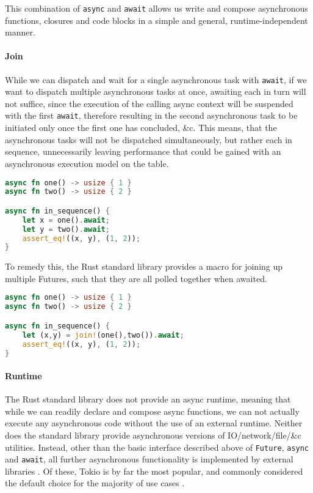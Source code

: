\documentclass[a4paper,UKenglish,cleveref, autoref, thm-restate]{lipics-v2021}
\begin{document}
This combination of \lstinline{async} and \lstinline{await} allows us write and compose asynchronous functions, closures and code blocks in a simple and general, runtime-independent manner.

\paragraph*{Join}

While we can dispatch and wait for a single asynchronous task with \lstinline{await}, if we want to dispatch multiple asynchronous tasks at once, awaiting each in turn will not suffice, since the execution of the calling async context will be suspended with the first \lstinline{await}, therefore resulting in the second asynchronous task to be initiated only once the first one has concluded, \&c. This means, that the asynchronous tasks will not be dispatched simultaneously, but rather each in sequence, unnecessarily leaving performance that could be gained with an asynchronous execution model on the table.

\begin{minipage}{\linewidth}
\begin{lstlisting}[language=Rust,caption={Sequential await},captionpos=t]
async fn one() -> usize { 1 }
async fn two() -> usize { 2 }

async fn in_sequence() {
    let x = one().await;
    let y = two().await;
    assert_eq!((x, y), (1, 2));
}
\end{lstlisting}
\end{minipage}

To remedy this, the Rust standard library provides a macro for joining up multiple Futures, such that they are all polled together when awaited.

\begin{minipage}{\linewidth}
\begin{lstlisting}[language=Rust,caption={Joined await},captionpos=t]
async fn one() -> usize { 1 }
async fn two() -> usize { 2 }

async fn in_sequence() {
    let (x,y) = join!(one(),two()).await;
    assert_eq!((x, y), (1, 2));
}
\end{lstlisting}
\end{minipage}

\paragraph*{Runtime}

The Rust standard library does not provide an async runtime, meaning that while we can readily declare and compose async functions, we can not actually execute any asynchronous code without the use of an external runtime. Neither does the standard library provide asynchronous versions of IO/network/file/\&c utilities. Instead, other than the basic interface described above of \lstinline{Future}, \lstinline{async} and \lstinline{await}, all further asynchronous functionality is implemented by external libraries \cite{TheAsync92:online}. Of these, Tokio is by far the most popular, and commonly considered the default choice for the majority of use cases \cite{AsyncRus83:online}.
\end{document}
